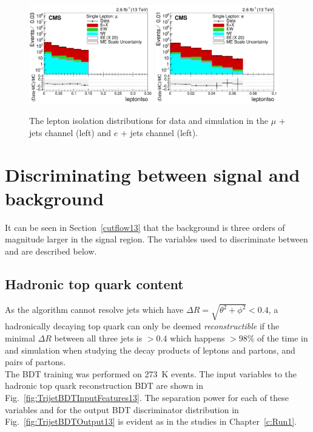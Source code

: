 \begin{figure}
    \includegraphics[width=0.48\textwidth]{images/Run2/leptonIso_StackLogY.pdf}
    \includegraphics[width=0.48\textwidth]{images/Run2/leptonIso_StackLogY_e.pdf}
    \caption{The lepton isolation distributions for data and simulation in the $\mu$ + jets channel (left) and $e$ + jets channel (left).}
    \label{fig:lepiso}
\end{figure}
\pagebreak

\section{Discriminating between signal and background}
\label{sec:discriminating13}
It can be seen in Section~\ref{cutflow13} that the \ttbar background is three orders of magnitude larger in the signal region. The variables used to discriminate between \ttbar and \tttt are described below.

\subsection{Hadronic top quark content}
\label{sec:topContent13}

As the \antikt algorithm cannot resolve jets which have $\Delta R = \sqrt{  \theta^{2} + \phi^{2} } < 0.4$, a hadronically decaying top quark can only be deemed \emph{reconstructible} if the minimal $\Delta R$ between all three jets is $> 0.4$ which happens $> 98\%$ of the time in \ttbar and \tttt simulation when studying the decay products of leptons and partons, and pairs of partons.\\
The BDT training was performed on 273~K \ttbar events. The input variables to the hadronic top quark reconstruction BDT are shown in Fig.~\ref{fig:TrijetBDTInputFeatures13}. The separation power for each of these variables and for the output BDT discriminator distribution in Fig.~\ref{fig:TrijetBDTOutput13} is evident as in the \runone studies in Chapter~\ref{c:Run1}. 

